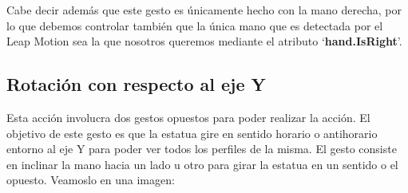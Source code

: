 \documentclass[a4paper,11pt]{article}
\begin{document}
Cabe decir además que este gesto es únicamente hecho con la mano derecha, por lo que debemos controlar también que la única mano que es detectada por el Leap Motion sea la que nosotros queremos mediante el atributo `\textbf{hand.IsRight}'.

\subsection{Rotación con respecto al eje Y}

Esta acción involucra dos gestos opuestos para poder realizar la acción. El objetivo de este gesto es que la estatua gire en sentido horario o antihorario entorno al eje Y para poder ver todos los perfiles de la misma. El gesto consiste en inclinar la mano hacia un lado u otro para girar la estatua en un sentido o el opuesto. Veamoslo en una imagen:
\end{document}
